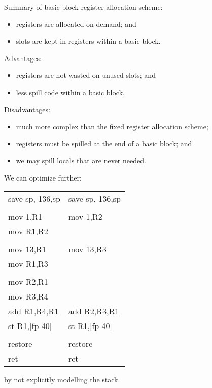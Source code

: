 \begin{slide*}
Summary of basic block register allocation scheme:

\begin{itemize}
\item registers are allocated on demand; and
\item slots are kept in registers within a basic block.
\end{itemize}
 
Advantages:
\begin{itemize}
\item registers are not wasted on unused slots; and
\item less spill code within a basic block.
\end{itemize}
 
Disadvantages:
\begin{itemize}
\item much more complex than the fixed register allocation scheme;
\item registers must be spilled at the end of a basic block; and
\item we may spill locals that are never needed.
\end{itemize}
\vfil
\end{slide*}
 
\begin{slide*}
\renewcommand{\arraystretch}{0.9}
We can optimize further:\\

\begin{center}
\begin{scriptsize}
\begin{tt}
\begin{tabular}{l@{~~~~~~~}l}
     save sp,-136,sp    &    save sp,-136,sp\\
 \\
     mov 1,R1           &    mov 1,R2\\
     mov R1,R2\\
 \\
     mov 13,R1          &    mov 13,R3\\
     mov R1,R3\\
 \\
     mov R2,R1            \\
     mov R3,R4\\
     add R1,R4,R1       &    add R2,R3,R1\\
     st R1,[fp-40]      &    st R1,[fp-40]\\
 \\
     restore            &    restore\\
     ret                &    ret
\end{tabular}
\end{tt}
\end{scriptsize}
\end{center}
\vspace*{2em}

by not explicitly modelling the stack.
\renewcommand{\arraystretch}{1}
\vfil
\end{slide*}
 

